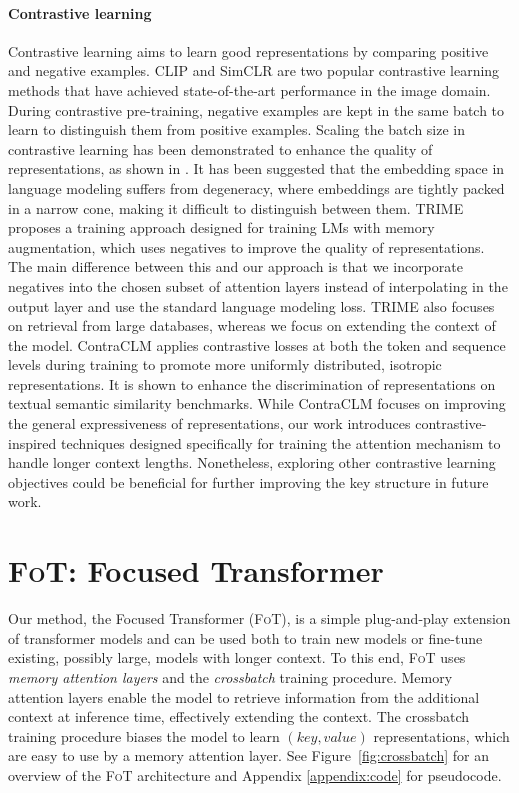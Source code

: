 \paragraph{Contrastive learning} Contrastive learning aims to learn good representations by comparing positive and negative examples. CLIP \citep{radford2021clip} and SimCLR \citep{chen2020simclr} are two popular contrastive learning methods that have achieved state-of-the-art performance in the image domain. During contrastive pre-training, negative examples are kept in the same batch to learn to distinguish them from positive examples. Scaling the batch size in contrastive learning has been demonstrated to enhance the quality of representations, as shown in \citep{gao2021scaling}. It has been suggested \citep{gao2019representation} that the embedding space in language modeling suffers from degeneracy, where embeddings are tightly packed in a narrow cone, making it difficult to distinguish between them. TRIME \citep{zhong2022training} proposes a training approach designed for training LMs with memory augmentation, which uses negatives to improve the quality of representations. The main difference between this and our approach is that we incorporate negatives into the chosen subset of attention layers instead of interpolating in the output layer {and use the standard language modeling loss}. {TRIME \citep{zhong2022training} also focuses on retrieval from large databases, whereas we focus on extending the context of the model.} ContraCLM \citep{jain2023contraclm} applies contrastive losses at both the token and sequence levels during training to promote more uniformly distributed, isotropic representations. It is shown to enhance the discrimination of representations on textual semantic similarity benchmarks. While ContraCLM focuses on improving the general expressiveness of representations, our work introduces contrastive-inspired techniques designed specifically for training the attention mechanism to handle longer context lengths. Nonetheless, exploring other contrastive learning objectives could be beneficial for further improving the key structure in future work.

\section{\textsc{FoT}: Focused Transformer} \label{section:methods}

Our method, the Focused Transformer (\textsc{FoT}), is a simple plug-and-play extension of transformer models and can be used both to train new models or fine-tune existing, possibly large, models with longer context. To this end, \textsc{FoT} uses \emph{memory attention layers} and the \emph{crossbatch} training procedure. Memory attention layers enable the model to retrieve information from the additional context at inference time, effectively extending the context. The crossbatch training procedure biases the model to learn $(key, value)$ representations, which are easy to use by a memory attention layer. See Figure~\ref{fig:crossbatch} for an overview of the \textsc{FoT} architecture and Appendix \ref{appendix:code} for pseudocode. 

